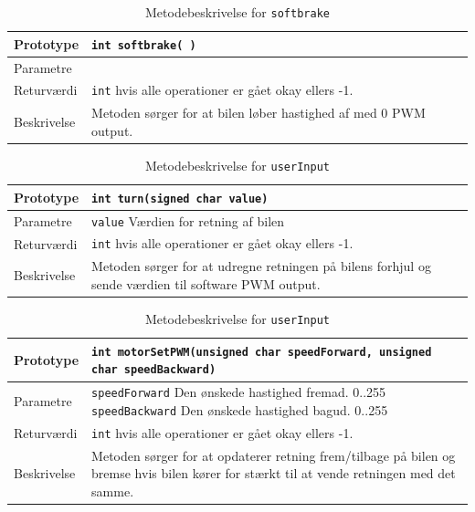 \begin{table}[H]
	\begin{tabularx}{\textwidth}{| L{2.5 cm} | Z |} \hline
		Prototype & \texttt{int softbrake( )} \\\hline
		Parametre & 
		\\\hline
		Returværdi &  \texttt{int}  hvis alle operationer er gået okay ellers -1. \\\hline
		Beskrivelse & Metoden sørger for at bilen løber hastighed af med 0 PWM output. \\\hline
	\end{tabularx}
	\caption{Metodebeskrivelse for \texttt{softbrake}}
	\label{table:met_softbrake}
\end{table}

\begin{table}[H]
	\begin{tabularx}{\textwidth}{| L{2.5 cm} | Z |} \hline
		Prototype & \texttt{int turn(signed char value)} \\\hline
		Parametre & \texttt{value} \newline
		Værdien for retning af bilen
		\\\hline
		Returværdi &  \texttt{int}  hvis alle operationer er gået okay ellers -1. \\\hline
		Beskrivelse & Metoden sørger for at udregne retningen på bilens forhjul og sende værdien til software PWM output. \\\hline
	\end{tabularx}
	\caption{Metodebeskrivelse for \texttt{userInput}}
	\label{table:met_userInput}
\end{table}

\begin{table}[H]
	\begin{tabularx}{\textwidth}{| L{2.5 cm} | Z |} \hline
		Prototype & \texttt{int motorSetPWM(unsigned char speedForward, unsigned char speedBackward)} \\\hline
		Parametre & \texttt{speedForward} \newline Den ønskede hastighed fremad. 0..255\newline
		\texttt{speedBackward} \newline Den ønskede hastighed bagud. 0..255
		\\\hline
		Returværdi &  \texttt{int}  hvis alle operationer er gået okay ellers -1. \\\hline
		Beskrivelse & Metoden sørger for at opdaterer retning frem/tilbage på bilen og bremse hvis bilen kører for stærkt til at vende retningen med det samme. \\\hline
	\end{tabularx}
	\caption{Metodebeskrivelse for \texttt{userInput}}
	\label{table:met_userInput}
\end{table}

